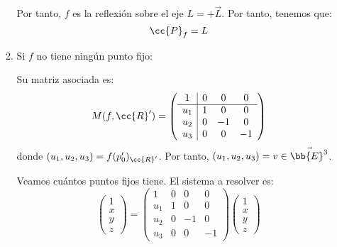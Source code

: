 \begin{enumerate}
\begin{enumerate}
        Por tanto, $f$ es la reflexión sobre el eje $L=+\vec{L}$. Por tanto, tenemos que:
        \begin{equation*}
            \cc{P}_f = L
        \end{equation*}

        \item Si $f$ no tiene ningún punto fijo:

        Su matriz asociada es:
        \begin{equation*}
            M(f,\cc{R}') = \left(\begin{array}{c|ccc}
                1 & 0 & 0 & 0 \\ \hline
                u_1 & 1 & 0 & 0\\ 
                u_2 & 0 & -1 & 0 \\
                u_3 & 0 & 0 & -1
            \end{array}\right)
        \end{equation*}
        donde $(u_1,u_2,u_3)=f(p_0')_{\cc{R}'}$. Por tanto, $(u_1, u_2, u_3)=v\in \vec{\bb{E}^3}$.
    
        Veamos cuántos puntos fijos tiene. El sistema a resolver es:
        \begin{equation*}
            \left(\begin{array}{c}
                1 \\ \hline x \\ y \\ z
            \end{array}\right)
            = \left(\begin{array}{c|ccc}
                1 & 0 & 0 & 0 \\ \hline
                u_1 & 1 & 0 & 0\\ 
                u_2 & 0 & -1 & 0 \\
                u_3 & 0 & 0 & -1
            \end{array}\right)
            \left(\begin{array}{c}
                1 \\ \hline x \\ y \\ z
            \end{array}\right)
        \end{equation*}


\end{enumerate}
\end{enumerate}
